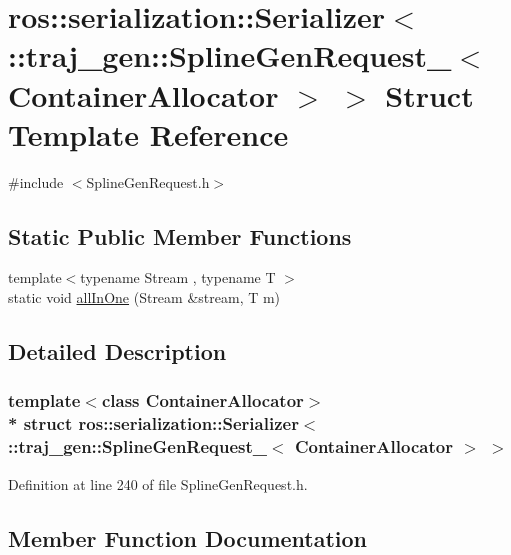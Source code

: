 \hypertarget{structros_1_1serialization_1_1_serializer_3_01_1_1traj__gen_1_1_spline_gen_request___3_01_container_allocator_01_4_01_4}{}\section{ros\+:\+:serialization\+:\+:Serializer$<$ \+:\+:traj\+\_\+gen\+:\+:Spline\+Gen\+Request\+\_\+$<$ Container\+Allocator $>$ $>$ Struct Template Reference}
\label{structros_1_1serialization_1_1_serializer_3_01_1_1traj__gen_1_1_spline_gen_request___3_01_container_allocator_01_4_01_4}


{\ttfamily \#include $<$Spline\+Gen\+Request.\+h$>$}

\subsection*{Static Public Member Functions}
\begin{DoxyCompactItemize}
\item 
{\footnotesize template$<$typename Stream , typename T $>$ }\\static void \hyperlink{structros_1_1serialization_1_1_serializer_3_01_1_1traj__gen_1_1_spline_gen_request___3_01_container_allocator_01_4_01_4_abbfb5eef6f1e42aaceceb16905ae0af1}{all\+In\+One} (Stream \&stream, T m)
\end{DoxyCompactItemize}


\subsection{Detailed Description}
\subsubsection*{template$<$class Container\+Allocator$>$\\*
struct ros\+::serialization\+::\+Serializer$<$ \+::traj\+\_\+gen\+::\+Spline\+Gen\+Request\+\_\+$<$ Container\+Allocator $>$ $>$}



Definition at line 240 of file Spline\+Gen\+Request.\+h.



\subsection{Member Function Documentation}
